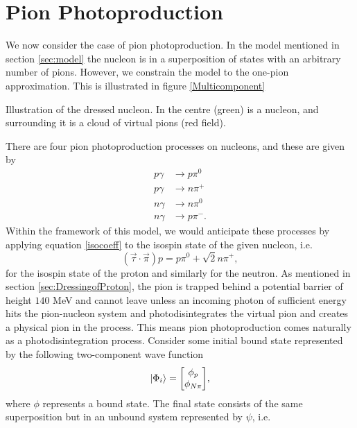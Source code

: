 \chapter{Pion Photoproduction}\label{sec:PionPhotoproduction}
We now consider the case of pion photoproduction. In the model mentioned in section \ref{sec:model} the nucleon is in a superposition of states with an arbitrary number of pions. However, we constrain the model to the one-pion approximation. This is illustrated in figure \ref{Multicomponent}
\begin{marginfigure}
	\centering
	
	\caption{Illustration of the dressed nucleon. In the centre (green) is a nucleon, and surrounding it is a cloud of virtual pions (red field). }
	\label{Multicomponent}
\end{marginfigure}
There are four pion photoproduction processes on nucleons, and these are given by
\begin{align}
	p \gamma & \rightarrow p \pi^0 \label{photonew1}\\
	p \gamma & \rightarrow n \pi^+ \label{photonew2}\\
	n \gamma & \rightarrow n \pi^0 \label{photonew3}\\
	n \gamma & \rightarrow p \pi^- \label{photonew4}.
\end{align}
Within the framework of this model, we would anticipate these processes by applying equation \eqref{isocoeff} to the isospin state of the given nucleon, i.e.
\begin{equation} \label{isovectorex}
	(\vec{\tau}\cdot\vec{\pi}) p = p\pi^0 + \sqrt{2}n\pi^+,
\end{equation}
for the isospin state of the proton and similarly for the neutron. As mentioned in section \ref{sec:DressingofProton}, the pion is trapped behind a potential barrier of height $140$ MeV and cannot leave unless an incoming photon of sufficient energy hits the pion-nucleon system and photodisintegrates the virtual pion and creates a physical pion in the process. This means pion photoproduction comes naturally as a photodisintegration process. Consider some initial bound state represented by the following two-component wave function
\begin{equation} \label{phii}
	\ket{\Phi_i} = \mqty[\phi_p \\ \phi_{N\pi}],
\end{equation}
where $\phi$ represents a bound state. The final state consists of the same superposition but in an unbound system represented by $\psi$, i.e.
